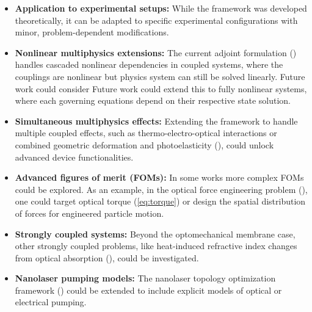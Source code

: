 \begin{itemize}
    \item \textbf{Application to experimental setups:} While the framework was developed theoretically, it can be adapted to specific experimental configurations with minor, problem-dependent modifications.
    
    \item \textbf{Nonlinear multiphysics extensions:} The current adjoint formulation () handles cascaded nonlinear dependencies in coupled systems, where the couplings are nonlinear but physics system can still be solved linearly. Future work could consider Future work could extend this to fully nonlinear systems, where each governing equations depend on their respective state solution.
    
    \item \textbf{Simultaneous multiphysics effects:} Extending the framework to handle multiple coupled effects, such as thermo-electro-optical interactions or combined geometric deformation and photoelasticity (), could unlock advanced device functionalities.
    
    \item \textbf{Advanced figures of merit (FOMs):} In some works more complex FOMs could be explored. As an example, in the optical force engineering problem (), one could target optical torque (\eqref{eq:torque}) or design the spatial distribution of forces for engineered particle motion.
    
    \item \textbf{Strongly coupled systems:} Beyond the optomechanical membrane case, other strongly coupled problems, like heat-induced refractive index changes from optical absorption (), could be investigated.
    
    \item \textbf{Nanolaser pumping models:} The nanolaser topology optimization framework () could be extended to include explicit models of optical or electrical pumping.
\end{itemize}